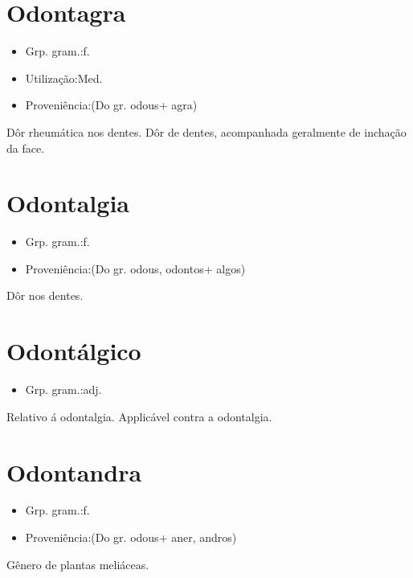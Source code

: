 \section{Odontagra}
\begin{itemize}
\item {Grp. gram.:f.}
\end{itemize}
\begin{itemize}
\item {Utilização:Med.}
\end{itemize}
\begin{itemize}
\item {Proveniência:(Do gr. \textunderscore odous\textunderscore  + \textunderscore agra\textunderscore )}
\end{itemize}
Dôr rheumática nos dentes.
Dôr de dentes, acompanhada geralmente de inchação da face.
\section{Odontalgia}
\begin{itemize}
\item {Grp. gram.:f.}
\end{itemize}
\begin{itemize}
\item {Proveniência:(Do gr. \textunderscore odous\textunderscore , \textunderscore odontos\textunderscore  + \textunderscore algos\textunderscore )}
\end{itemize}
Dôr nos dentes.
\section{Odontálgico}
\begin{itemize}
\item {Grp. gram.:adj.}
\end{itemize}
Relativo á odontalgia.
Applicável contra a odontalgia.
\section{Odontandra}
\begin{itemize}
\item {Grp. gram.:f.}
\end{itemize}
\begin{itemize}
\item {Proveniência:(Do gr. \textunderscore odous\textunderscore  + \textunderscore aner\textunderscore , \textunderscore andros\textunderscore )}
\end{itemize}
Gênero de plantas meliáceas.
